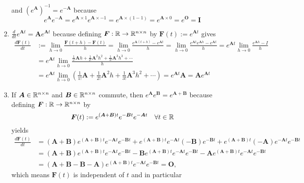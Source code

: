 \documentclass[12pt,a4paper]{article}
\begin{document}
\begin{itemize}
\begin{enumerate}
      and $(e^{\bm{A}})^{-1}=e^{-\bm{A}}$ because
      \begin{equation}\nonumber%
        e^{\bm{A}}e^{-\bm{A}} = e^{\bm{A}\times 1}e^{\bm{A}\times -1} = e^{\bm{A}\times(1-1)} = e^{\bm{A}\times 0} = e^{\bm{O}} = \bm{I}
      \end{equation}
    \item $\frac{d}{dt}e^{\bm{A}t} = \bm{A}e^{\bm{A}t}$
      because defining $\bm{F}:\mathbb{R}\to\mathbb{R}^{n\times n}$ by $\bm{F}(t):=e^{\bm{A}t}$ gives
      \begin{align}
        \frac{d \bm{F}(t)}{dt}
        & := \lim_{h\to 0}\frac{\bm{F}(t+h)-\bm{F}(t)}{h}
        = \lim_{h\to 0}\frac{e^{\bm{A}(t+h)} - e^{\bm{A}t}}{h}
        = \lim_{h\to 0}\frac{e^{\bm{A}t}e^{\bm{A}h} - e^{\bm{A}t}}{h}
        = e^{\bm{A}t}\lim_{h\to 0}\frac{e^{\bm{A}h} - I}{h}  \nonumber \\
        & = e^{\bm{A}t}\lim_{h\to 0}\frac{\frac{1}{1!}\bm{A}h + \frac{1}{2!}\bm{A}^{2}h^{2} + \frac{1}{3!}\bm{A}^{3}h^{3}+\cdots }{h}  \nonumber \\
        & = e^{\bm{A}t}\lim_{h\to 0}\left(\frac{1}{1!}\bm{A} + \frac{1}{2!}\bm{A}^{2}h + \frac{1}{3!}\bm{A}^{3}h^{2} + \cdots \right) = e^{\bm{A}t}\bm{A} = \bm{A} e^{\bm{A}t}
        \nonumber%
      \end{align}
    \item If $\bm{A}\in \mathbb{R}^{n\times n}$ and $\bm{B}\in \mathbb{R}^{n\times n}$ commute, then $e^{\bm{A}}e^{\bm{B}} = e^{\bm{A}+\bm{B}}$ because
      defining $\bm{F}:\mathbb{R} \to \mathbb{R}^{n\times n}$ by
      \begin{equation}\nonumber%
        \bm{F}(t) := e^{(\bm{A}+\bm{B})t}e^{-\bm{B}t}e^{-\bm{A}t} \quad \forall t \in \R
      \end{equation}
      yields
      \begin{align}
        \frac{d \bm{F}(t)}{dt}
          & = (\bm{A}+\bm{B})e^{(\bm{A}+\bm{B})t}e^{-\bm{A}t}e^{-\bm{B}t} + e^{(\bm{A}+\bm{B})t}e^{-\bm{A}t}(-\bm{B})e^{-\bm{B}t} + e^{(\bm{A}+\bm{B})t}(-\bm{A})e^{-\bm{A}t}e^{-\bm{B}t} \nonumber \\
          & = (\bm{A}+\bm{B})e^{(\bm{A}+\bm{B})t}e^{-\bm{A}t}e^{-\bm{B}t} -\bm{B}e^{(\bm{A}+\bm{B})t}e^{-\bm{A}t}e^{-\bm{B}t} -\bm{A}e^{(\bm{A}+\bm{B})t}e^{-\bm{A}t}e^{-\bm{B}t} \nonumber \\
          & = (\bm{A}+\bm{B}-\bm{B}-\bm{A})e^{(\bm{A}+\bm{B})t}e^{-\bm{A}t}e^{-\bm{B}t} = \bm{O},
      \nonumber%
      \end{align}
      which means $\bm{F}(t)$ is independent of $t$ and in particular

\end{enumerate}
\end{itemize}
\end{document}
